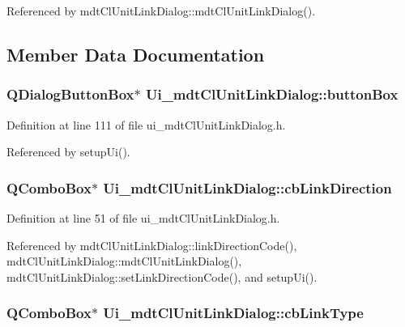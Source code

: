 Referenced by mdt\-Cl\-Unit\-Link\-Dialog\-::mdt\-Cl\-Unit\-Link\-Dialog().



\subsection{Member Data Documentation}
\hypertarget{class_ui__mdt_cl_unit_link_dialog_ae62ee85f0f4de408f30ae14ce0044fd1}{
\subsubsection[{button\-Box}]{\setlength{\rightskip}{0pt plus 5cm}Q\-Dialog\-Button\-Box$\ast$ Ui\-\_\-mdt\-Cl\-Unit\-Link\-Dialog\-::button\-Box}}\label{class_ui__mdt_cl_unit_link_dialog_ae62ee85f0f4de408f30ae14ce0044fd1}


Definition at line 111 of file ui\-\_\-mdt\-Cl\-Unit\-Link\-Dialog.\-h.



Referenced by setup\-Ui().

\hypertarget{class_ui__mdt_cl_unit_link_dialog_a0ce7ebc2f08ada01ae0108d72a8fd743}{
\subsubsection[{cb\-Link\-Direction}]{\setlength{\rightskip}{0pt plus 5cm}Q\-Combo\-Box$\ast$ Ui\-\_\-mdt\-Cl\-Unit\-Link\-Dialog\-::cb\-Link\-Direction}}\label{class_ui__mdt_cl_unit_link_dialog_a0ce7ebc2f08ada01ae0108d72a8fd743}


Definition at line 51 of file ui\-\_\-mdt\-Cl\-Unit\-Link\-Dialog.\-h.



Referenced by mdt\-Cl\-Unit\-Link\-Dialog\-::link\-Direction\-Code(), mdt\-Cl\-Unit\-Link\-Dialog\-::mdt\-Cl\-Unit\-Link\-Dialog(), mdt\-Cl\-Unit\-Link\-Dialog\-::set\-Link\-Direction\-Code(), and setup\-Ui().

\hypertarget{class_ui__mdt_cl_unit_link_dialog_aee6a2a148c7b6552d1531b189811c6c5}{
\subsubsection[{cb\-Link\-Type}]{\setlength{\rightskip}{0pt plus 5cm}Q\-Combo\-Box$\ast$ Ui\-\_\-mdt\-Cl\-Unit\-Link\-Dialog\-::cb\-Link\-Type}}\label{class_ui__mdt_cl_unit_link_dialog_aee6a2a148c7b6552d1531b189811c6c5}


